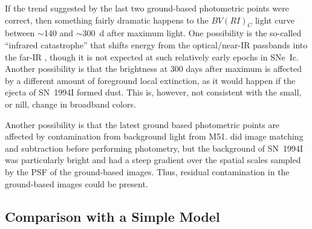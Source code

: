 \documentclass[12pt,manuscript]{aastex}
\begin{document}
If the trend suggested by the last two ground-based photometric 
points were correct, then something fairly dramatic happens to 
the $BV(RI)_C$ light curve between $\sim$140 and $\sim$300~d 
after maximum light.
%
One possibility is the so-called ``infrared catastrophe'' that 
shifts energy from the optical/near-IR passbands into the 
far-IR \citep{fc89,kandf98}, though it is not expected at 
such relatively early epochs in SNe~Ic.
%
Another possibility is that the brightness at 300 days after maximum
is affected by a different amount of foreground local extinction, as it would
happen if the ejecta of SN~1994I formed dust.
%
This is, however, not consistent with the small, or nill, change in broadband
colors.

Another possibility is that the latest ground based photometric points are
affected by contamination from background light from M51.
%
\citet{retal96} did image matching and subtraction before 
performing photometry, but the background of SN~1994I
was particularly bright and had a steep gradient over the spatial
scales sampled by the PSF of the ground-based images. Thus,
residual contamination in the ground-based images could be present.

\subsection{Comparison with a Simple Model}
\end{document}
